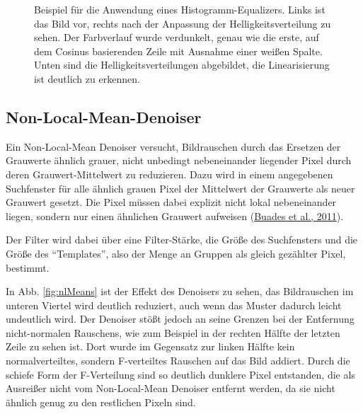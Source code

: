 \documentclass[
  12pt,
  openany]{book}
\begin{document}
\begin{figure}
{}

\caption[Beispiel für die Anwendung eines Histogramm-Equalizers.]{Beispiel für die Anwendung eines Histogramm-Equalizers. Links ist das Bild vor, rechts nach der Anpassung der Helligkeitsverteilung zu sehen. Der Farbverlauf wurde verdunkelt, genau wie die erste, auf dem Cosinus basierenden Zeile mit Ausnahme einer weißen Spalte. Unten sind die Helligkeitsverteilungen abgebildet, die Linearisierung ist deutlich zu erkennen.}\label{fig:histEqual}
\end{figure}

\hypertarget{non-local-mean-denoiser}{%
\subsection{Non-Local-Mean-Denoiser}\label{non-local-mean-denoiser}}

Ein Non-Local-Mean Denoiser versucht, Bildrauschen durch das Ersetzen der Grauwerte ähnlich grauer, nicht unbedingt nebeneinander liegender Pixel durch deren Grauwert-Mittelwert zu reduzieren. Dazu wird in einem angegebenen Suchfenster für alle ähnlich grauen Pixel der Mittelwert der Grauwerte als neuer Grauwert gesetzt. Die Pixel müssen dabei explizit nicht lokal nebeneinander liegen, sondern nur einen ähnlichen Grauwert aufweisen (\protect\hyperlink{ref-buadesNonLocalMeansDenoising2011}{Buades et al., 2011}).

Der Filter wird dabei über eine Filter-Stärke, die Größe des Suchfensters und die Größe des ``Templates'', also der Menge an Gruppen als gleich gezählter Pixel, bestimmt.

In Abb. \ref{fig:nlMeans} ist der Effekt des Denoisers zu sehen, das Bildrauschen im unteren Viertel wird deutlich reduziert, auch wenn das Muster dadurch leicht undeutlich wird. Der Denoiser stößt jedoch an seine Grenzen bei der Entfernung nicht-normalen Rauschens, wie zum Beispiel in der rechten Hälfte der letzten Zeile zu sehen ist. Dort wurde im Gegensatz zur linken Hälfte kein normalverteiltes, sondern F-verteiltes Rauschen auf das Bild addiert. Durch die schiefe Form der F-Verteilung sind so deutlich dunklere Pixel entstanden, die als Ausreißer nicht vom Non-Local-Mean Denoiser entfernt werden, da sie nicht ähnlich genug zu den restlichen Pixeln sind.
\end{document}

